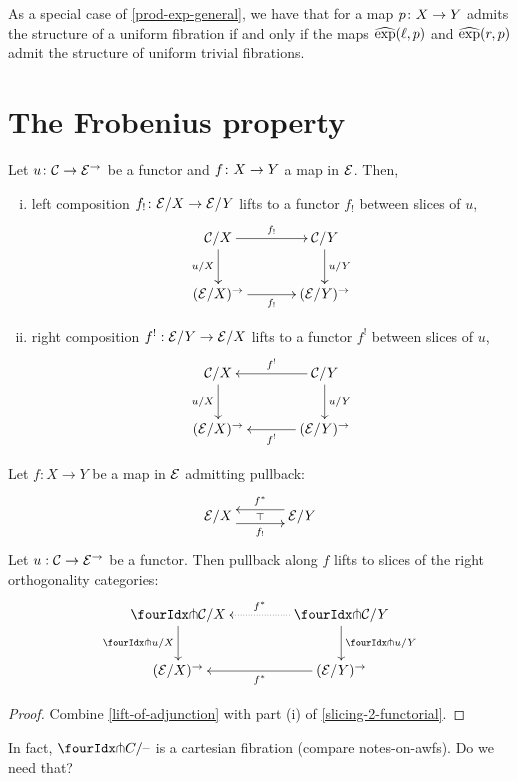 \documentclass[reqno,10pt,a4paper,oneside]{amsart}
\begin{document}
 As a special case of \cref{prod-exp-general}, we have
that for a map $p \colon X \to Y$ admits the structure of a uniform  fibration 
if and only if 
 the maps $\operatorname{\widehat{exp}}(\ell, p)$ and $\operatorname{\widehat{exp}}(r, p)$ admit the structure of
uniform trivial  fibrations. 




\section{The Frobenius property}
\label{sec:frobenius}

\begin{lemma}
\label{slicing-2-functorial}
Let $u \colon \mathcal{C} \to \mathcal{E}^{\to}$ be a functor and $f \colon X \to Y$ a map in $\mathcal{E}$. Then, 
\begin{enumerate}[(i)]
\item left composition $f_! \colon \mathcal{E}/X \to \mathcal{E}/Y$ lifts to a functor $f_!$ between slices of $u$,
\[
\xymatrix@C+1em{
  \cal{C}/X
  \ar[r]^-{f_!}
  \ar[d]_{u/X}
&
  \cal{C}/Y
  \ar[d]^{u/Y}
\\
  (\calE/X)^{\to}
  \ar[r]_-{f_!}
&
  (\calE/Y)^{\to}
}
\]
\item right composition $f^! : \mathcal{E}/Y \to \mathcal{E}/X$ lifts to a functor $f^!$ between slices of $u$,
\[
\xymatrix@C+1em{
  \cal{C}/X
  \ar[d]_{u/X}
&
  \cal{C}/Y
  \ar[l]_-{f^!}
  \ar[d]^{u/Y}
\\
  (\calE/X)^{\to}
&
  (\calE/Y)^{\to}
  \ar[l]^-{f^!}
}
\]
\end{enumerate}
\end{lemma}

\begin{proposition}
\label{lift-pullback}
Let $f : X \to Y$ be a map in $\mathcal{E}$ admitting pullback:
\[
\xymatrix@C+1em{
  \catE/X
  \ar@<-5pt>[r]_{f_!}
  \ar@{}[r]|{\top}
&
  \catE/Y
  \ar@<-5pt>[l]_{f^*}
}
\]
Let $u : \mathcal{C} \to \mathcal{E}^{\to}$ be a functor.
Then pullback along $f$ lifts to slices of the right orthogonality categories:
\[
\xymatrix@C=1.5cm{
  \liftr{\cal{C}}/X
  \ar[d]_{\liftr{u}/X}
&
  \liftr{\cal{C}}/Y
  \ar@{.>}[l]_{f^*}
  \ar[d]^{\liftr{u}/Y}
\\
  (\catE/X)^{\to}
&
  (\catE/Y)^{\to}
  \ar[l]^{f^*}
}
\]
\end{proposition}

\begin{proof}
Combine \cref{lift-of-adjunction} with part (i) of \cref{slicing-2-functorial}.
\end{proof}

\begin{question}
In fact, $\liftr{C}/\text{--}$ is a cartesian fibration (compare notes-on-awfs).
Do we need that?
\end{question}
\end{document}
